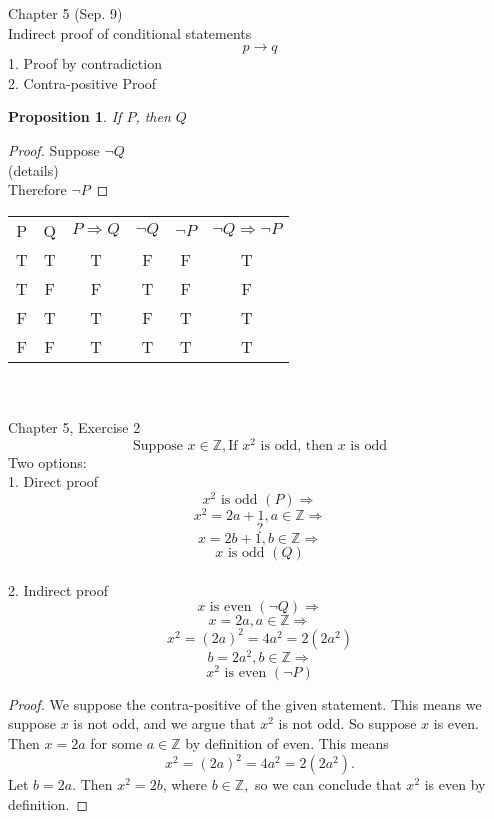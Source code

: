 \documentclass[12pt,fleqn]{article}
\newtheorem*{prop}{Proposition}
\begin{document}
	
	
	\noindent Chapter 5 (Sep. 9)\\
	Indirect proof of conditional statements
	$$p \longrightarrow q$$
	1. Proof by contradiction\\
	2. Contra-positive Proof\\
	\begin{prop}
		If $P$, then $Q$
	\end{prop}
	\begin{proof}
		Suppose $\neg Q$\\
		(details)\\
		Therefore $\neg P$
	\end{proof}
	
	\begin{tabular}{c c c c c c}
		P&Q&$P\Longrightarrow Q$&$\neg Q$&$\neg P$&$\neg Q \Longrightarrow \neg P$  \\
		T&T&T&F&F&T\\
		T&F&F&T&F&F\\
		F&T&T&F&T&T\\
		F&F&T&T&T&T\\
	\end{tabular}\\
	\\
	Chapter 5, Exercise 2\\
	$$\textrm{Suppose } x\in\mathbb{Z}, \textrm{If }x^2 \textrm{ is odd, then }x \textrm{ is odd} $$
	Two options:\\
	1. Direct proof\\
	$$x^2 \textrm{ is odd } (P) \Longrightarrow$$ 
	$$x^2=2a+1, a \in\mathbb{Z} \Longrightarrow$$ 
	$$?$$
	$$x=2b+1, b\in \mathbb{Z} \Longrightarrow$$
	$$x \textrm{ is odd } (Q)$$\\
	
	2. Indirect proof\\
	$$x \textrm{ is even } (\neg Q) \Longrightarrow$$ 
	$$x=2a, a\in \mathbb{Z} \Longrightarrow$$ 
	$$x^2=(2a)^2=4a^2=2(2a^2)$$ 
	$$b=2a^2, b\in \mathbb{Z} \Longrightarrow$$
	$$x^2 \textrm{ is even }(\neg P)$$
	
	\begin{proof}
		We suppose the contra-positive of the given statement. This means we suppose $x$ is not odd, and we argue that $x^2$ is not odd. So suppose $x$ is even. Then $x=2a$ for some $a\in \mathbb{Z}$ by definition of even. This means 
		$$x^2=(2a)^2=4a^2=2(2a^2).$$
		Let $b=2a$. Then $x^2=2b$, where $b\in\mathbb{Z},$ so we can conclude that $x^2$ is even by definition. 
	\end{proof}
	
\end{document}

